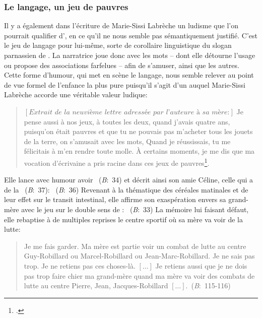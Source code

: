 \subsubsection{Le langage, un jeu de pauvres}
Il y a également dans l'écriture de Marie-Sissi Labrèche un ludisme que l'on pourrait qualifier d', en ce qu'il ne nous semble pas sémantiquement justifié.
C'est le jeu de langage pour lui-même, sorte de corollaire linguistique du slogan parnassien de .
La narratrice joue donc avec les mots -- dont elle détourne l'usage ou propose des associations farfelues -- afin de s'amuser, ainsi que les autres.
Cette forme d'humour, qui met en scène le langage, nous semble relever au point de vue formel de l'enfance la plus pure puisqu'il s'agit d'un  auquel Marie-Sissi Labrèche accorde une véritable valeur ludique:
\begin{quote}
  \begin{singlespace}
    \small
    $\left[\textit{Extrait de la neuvième lettre adressée par l'auteure à sa mère:}\right]$
    Je pense aussi à nos jeux, à toutes les deux, quand j'avais quatre ans, puisqu'on était pauvres et que tu ne pouvais pas m'acheter tous les jouets de la terre, on s'amusait avec les mots,  Quand je réussissais, tu me félicitais à m'en rendre toute molle. À certains moments, je me dis que ma vocation d'écrivaine a pris racine dans ces jeux de pauvres\footcite[186]{Labreche2008a}.
    \normalsize
  \end{singlespace}
\end{quote}
Elle lance avec humour avoir ~(\textit{B}:~34) et décrit ainsi son amie Céline, celle qui a de la ~(\textit{B}:~37): ~(\textit{B}:~36)
Revenant à la thématique des céréales matinales et de leur effet sur le transit intestinal, elle affirme son exaspération envers sa grand-mère avec le jeu sur le double sens de : ~(\textit{B}:~33)
La mémoire lui faisant défaut, elle rebaptise à de multiples reprises le centre sportif où sa mère va voir de la lutte:
\begin{quote}
  \begin{singlespace}
    \small
    Je me fais garder. Ma mère est partie voir un combat de lutte au centre Guy-Robillard ou Marcel-Robillard ou Jean-Marc-Robillard. Je ne sais pas trop. Je ne retiens pas ces choses-là. $\left[ \dots \right]$ Je retiens aussi que je ne dois pas trop faire chier ma grand-mère quand ma mère va voir des combats de lutte au centre Pierre, Jean, Jacques-Robillard $\left[ \dots \right]$.~(\textit{B}:~115-116)
    \normalsize
  \end{singlespace}
\end{quote}
